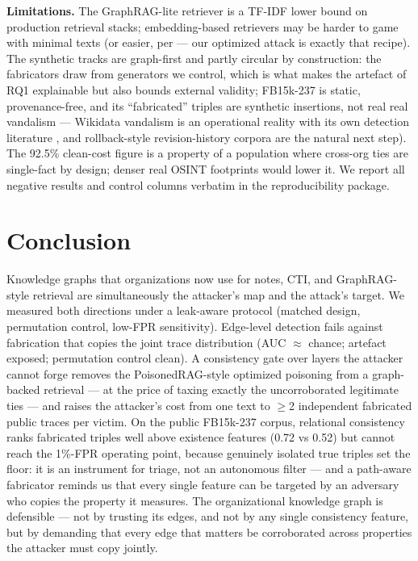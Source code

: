 \documentclass[conference]{IEEEtran}
\begin{document}
\textbf{Limitations.} The GraphRAG-lite retriever is a TF-IDF lower bound
on production retrieval stacks; embedding-based retrievers may be harder
to game with minimal texts (or easier, per \cite{zou2024poisonedrag} ---
our optimized attack is exactly that recipe). The synthetic tracks are
graph-first and partly circular by construction: the fabricators draw from
generators we control, which is what makes the artefact of RQ1 explainable
but also bounds external validity; FB15k-237 is static, provenance-free,
and its ``fabricated'' triples are synthetic insertions, not real
real vandalism --- Wikidata vandalism is an operational reality with its
own detection literature \cite{heindorf2017wsdmcup,heindorf2019debiasing},
and rollback-style revision-history corpora \cite{schmelzeisen2022wikidated}
are the natural next step). The 92.5\% clean-cost figure is a property of a population where
cross-org ties are single-fact by design; denser real OSINT footprints
would lower it. We report all negative results and control columns
verbatim in the reproducibility package.

\section{Conclusion}
\label{sec:conclusion}
Knowledge graphs that organizations now use for notes, CTI, and
GraphRAG-style retrieval are simultaneously the attacker's map and the
attack's target. We measured both directions under a leak-aware protocol
(matched design, permutation control, low-FPR sensitivity). Edge-level
detection fails against fabrication
that copies the joint trace distribution (AUC $\approx$ chance; artefact
exposed; permutation control clean). A consistency gate over layers the
attacker cannot forge removes the PoisonedRAG-style optimized poisoning
from a graph-backed retrieval --- at the price of taxing exactly the
uncorroborated legitimate ties --- and raises the attacker's cost from one
text to $\ge$2 independent fabricated public traces per victim. On the
public FB15k-237 corpus, relational consistency ranks fabricated triples
well above existence features (0.72 vs 0.52) but cannot reach the
1\%-FPR operating point, because genuinely isolated true triples set the
floor: it is an instrument for triage, not an autonomous filter --- and a
path-aware fabricator reminds us that every single feature can be
targeted by an adversary who copies the property it measures. The
organizational knowledge graph is defensible --- not by trusting its
edges, and not by any single consistency feature, but by demanding that
every edge that matters be corroborated across properties the attacker
must copy jointly.
\end{document}
